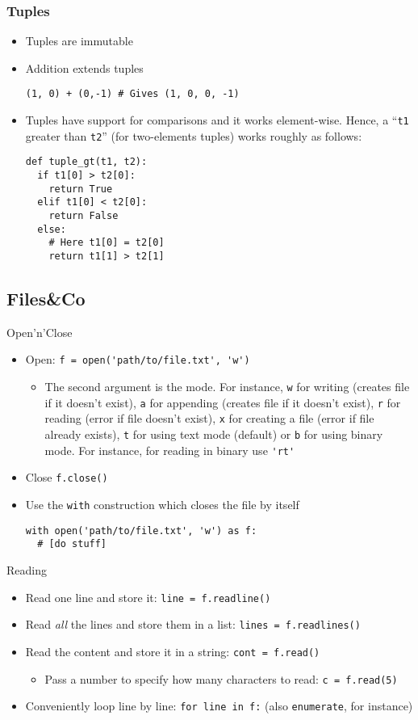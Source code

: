 \documentclass[a4paper,12pt,%
              final%
              ]{article}
\begin{document}
\subsubsection{Tuples}%
\begin{itemize}
  \item Tuples are immutable
  \item Addition extends tuples
\begin{verbatim}
(1, 0) + (0,-1) # Gives (1, 0, 0, -1)
\end{verbatim}
  \item Tuples have support for comparisons and it works element-wise. Hence, a ``\texttt{t1} greater than \texttt{t2}'' (for two-elements tuples) works roughly as follows:
\begin{verbatim}
def tuple_gt(t1, t2):
  if t1[0] > t2[0]:
    return True
  elif t1[0] < t2[0]:
    return False
  else:
    # Here t1[0] = t2[0]
    return t1[1] > t2[1]
\end{verbatim}
\end{itemize}

\subsection{Files\&Co}
Open'n'Close
\begin{itemize}
  \item Open: \verb|f = open('path/to/file.txt', 'w')|
    \begin{itemize}
      \item The second argument is the mode. For instance, \verb|w| for writing (creates file if it doesn't exist), \verb|a| for appending (creates file if it doesn't exist), \verb|r| for reading (error if file doesn't exist), \verb|x| for creating a file (error if file already exists), \verb|t| for using text mode (default) or \verb|b| for using binary mode. For instance, for reading in binary use \verb|'rt'|
    \end{itemize}
  \item Close \verb|f.close()|
  \item Use the \verb|with| construction which closes the file by itself
\begin{verbatim}
with open('path/to/file.txt', 'w') as f:
  # [do stuff]
\end{verbatim}
\end{itemize}

Reading
\begin{itemize}
  \item Read one line and store it: \verb|line = f.readline()|
  \item Read \emph{all} the lines and store them in a list: \verb|lines = f.readlines()|
  \item Read the content and store it in a string: \verb|cont = f.read()|
    \begin{itemize}
      \item Pass a number to specify how many characters to read: \verb|c = f.read(5)|
    \end{itemize}
  \item Conveniently loop line by line: \verb|for line in f:| (also \verb|enumerate|, for instance)
\end{itemize}
\end{document}
